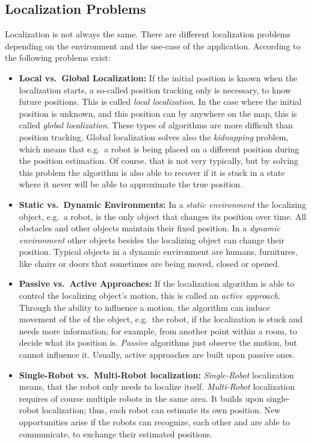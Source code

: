 \subsection{Localization Problems}
Localization is not always the same. There are different localization problems depending on the environment and the use-case of the application. According to \citet{thrun:prob_robo} the following problems exist:
\begin{itemize}
\item \textbf{Local vs.\ Global Localization:} If the initial position is known when the localization starts, a so-called position tracking only is necessary, to know future positions. This is called \emph{local localization}. In the case where the initial position is unknown, and this position can by anywhere on the map, this is called \emph{global localization}. These types of algorithms are more difficult than position tracking. Global localization solves also the \emph{kidnapping} problem, which means that e.g.\ a robot is being placed on a different position during the position estimation. Of course, that is not very typically, but by solving this problem the algorithm is also able to recover if it is stuck in a state where it never will be able to approximate the true position.

\item\textbf{Static vs.\ Dynamic Environments:} In a \emph{static environment} the localizing object, e.g.\ a robot, is the only object that changes its position over time. All obstacles and other objects maintain their fixed position. In a \emph{dynamic environment} other objects besides the localizing object can change their position. Typical objects in a dynamic environment are humans, furnitures, like chairs or doors that sometimes are being moved, closed or opened.

\item\textbf{Passive vs.\ Active Approaches:} If the localization algorithm is able to control the localizing object's motion, this is called an \emph{active approach}. Through the ability to influence a motion, the algorithm can induce movement of the of the object, e.g.\ the robot, if the localization is stuck and needs more information; for example, from another point within a room, to decide what its position is. \emph{Passive} algorithms just observe the motion, but cannot influence it. Usually, active approaches are built upon passive ones.

\item\textbf{Single-Robot vs.\ Multi-Robot localization:} \emph{Single-Robot} localization means, that the robot only needs to localize itself. \emph{Multi-Robot} localization requires of course multiple robots in the same area. It builds upon single-robot localization; thus, each robot can estimate its own position. New opportunities arise if the robots can recognize, each other and are able to communicate, to exchange their estimated positions.
\end{itemize}

